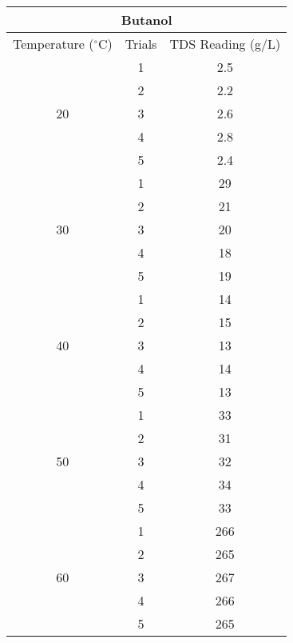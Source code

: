 

\begin{table}[H]
  \centering
    \begin{tabular}{ccc}
    \toprule
    \multicolumn{3}{c}{Butanol} \\
    \midrule
    Temperature ($^\circ$C) & Trials & TDS Reading (g/L)  \\
    \midrule
    \multirow{5}[10]{*}{20} & 1     & 2.5 \\
\cmidrule{2-3}          & 2     & 2.2 \\
\cmidrule{2-3}          & 3     & 2.6 \\
\cmidrule{2-3}          & 4     & 2.8 \\
\cmidrule{2-3}          & 5     & 2.4 \\
    \midrule
    \multirow{5}[10]{*}{30} & 1     & 29 \\
\cmidrule{2-3}          & 2     & 21 \\
\cmidrule{2-3}          & 3     & 20 \\
\cmidrule{2-3}          & 4     & 18 \\
\cmidrule{2-3}          & 5     & 19 \\
    \midrule
    \multirow{5}[10]{*}{40} & 1     & 14 \\
\cmidrule{2-3}          & 2     & 15 \\
\cmidrule{2-3}          & 3     & 13 \\
\cmidrule{2-3}          & 4     & 14 \\
\cmidrule{2-3}          & 5     & 13 \\
    \midrule
    \multirow{5}[10]{*}{50} & 1     & 33 \\
\cmidrule{2-3}          & 2     & 31 \\
\cmidrule{2-3}          & 3     & 32 \\
\cmidrule{2-3}          & 4     & 34 \\
\cmidrule{2-3}          & 5     & 33 \\
    \midrule
    \multirow{5}[10]{*}{60} & 1     & 266 \\
\cmidrule{2-3}          & 2     & 265 \\
\cmidrule{2-3}          & 3     & 267 \\
\cmidrule{2-3}          & 4     & 266 \\
\cmidrule{2-3}          & 5     & 265 \\
    \bottomrule
    \end{tabular}%
  \label{tab:addlabel}%
\end{table}%

